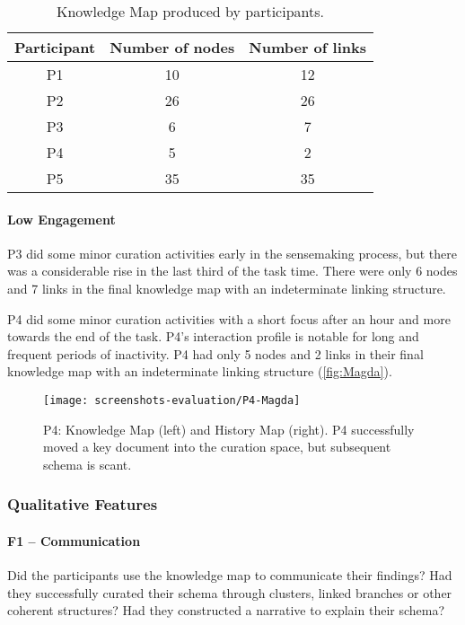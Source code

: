 \begin{table}[!htb]
\centering
\sffamily\small
\caption{Knowledge Map produced by participants.}
\label{table:knowledge}
\begin{tabular}{ccc}
	\toprule
	\textbf{Participant} & \textbf{Number of nodes} & \textbf{Number of links} \\
	\midrule
 		P1 & 10 & 12 \\
		P2 & 26 & 26 \\
		P3 & 6 & 7 \\
		P4 & 5 & 2 \\
		P5 & 35 & 35 \\
	\bottomrule
\end{tabular}
\end{table}

\paragraph{Low Engagement}
P3 did some minor curation activities early in the sensemaking process, but there was a considerable rise in the last third of the task time. There were only 6 nodes and 7 links in the final knowledge map with an indeterminate linking structure.

P4 did some minor curation activities with a short focus after an hour and more towards the end of the task. P4's interaction profile is notable for long and frequent periods of inactivity. P4 had only 5 nodes and 2 links in their final knowledge map with an indeterminate linking structure (\autoref{fig:Magda}).

\begin{figure}[!htb]
	\centering
	\texttt{[image: screenshots-evaluation/P4-Magda]}
	\caption{P4: Knowledge Map (left) and History Map (right). P4 successfully moved a key document into the curation space, but subsequent schema is scant.}
	\label{fig:Magda}
\end{figure}

\subsubsection{Qualitative Features}

\paragraph{F1 -- Communication}
Did the participants use the knowledge map to communicate their findings? Had they successfully curated their schema through clusters, linked branches or other coherent structures? Had they constructed a narrative to explain their schema?

